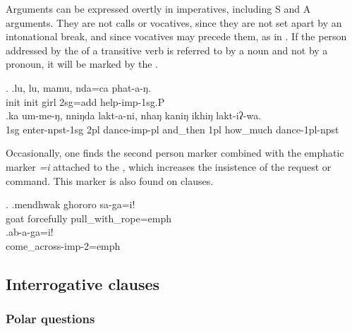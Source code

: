 \newpage %
Arguments can be expressed overtly in imperatives, including S and A arguments. They are not calls or vocatives, since they are not set apart by an intonational break, and since vocatives may precede them, as in \Next[a]. If the person addressed by the  of a transitive verb is referred to by a noun and not by a pronoun, it will be marked by the .

\ex. \ag.lu,         lu,         mamu, nda=ca        phat-a-ŋ.\\
{\sc init} {\sc init} girl {\sc 2sg=add} help{\sc -imp-1sg.P} \\
 
\bg.ka  um-me-ŋ,            nniŋda lakt-a-ni,           nhaŋ    kaniŋ ikhiŋ   lakt-iʔ-wa.\\
{\sc 1sg} enter{\sc -npst-1sg}  {\sc 2pl} dance{\sc -imp-pl} and\_then {\sc 1pl} how\_much dance{\sc -1pl-npst}\\
 

Occasionally, one finds the second person marker combined with the emphatic marker \emph{=i} attached to the , which increases the insistence  of the request or command. This marker is also found on  clauses.

\ex. \ag.mendhwak ghororo sa-ga=i!\\
goat forcefully pull\_with\_rope{=emph}\\
\bg.ab-a-ga=i!\\
come\_across{\sc -imp-2=emph}\\

\subsection{Interrogative clauses}
  
  
  
\subsubsection{Polar questions}
 
